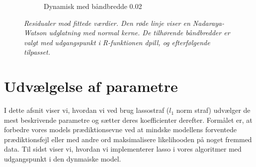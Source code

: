 \documentclass[11pt,a4paper]{article}
\begin{document}
\begin{figure}[h!]
\begin{subfigure}[b]{0.425\linewidth}
    \caption{Dynamisk med båndbredde 0.02}
    \label{fig:ResDU}
  \end{subfigure}
  \caption{\textit{Residualer mod fittede værdier. Den røde linje viser en Nadaraya-Watson udglatning med normal kerne. De tilhørende båndbredder er valgt med udgangspunkt i R-funktionen dpill, og efterfølgende tilpasset.}}
  \label{fig:residualplot}
\end{figure}
\clearpage
\section{Udvælgelse af parametre}
I dette afsnit viser vi, hvordan vi ved brug lassostraf ($l_1$ norm straf) udvælger de mest beskrivende parametre og sætter deres koefficienter derefter. Formålet er, at forbedre vores models prædiktionsevne ved at mindske modellens forventede prædiktionsfejl eller med andre ord maksimalisere likelihooden på noget fremmed data. Til sidst viser vi, hvordan vi implementerer lasso i vores algoritmer med udgangspunkt i den dynmaiske model.\\\\
\end{document}
